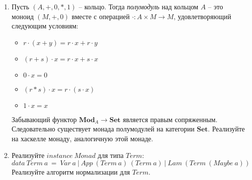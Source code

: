\documentclass[draft]{article}
\newcommand{\cat}[1]{\mathbf{#1}}
\newcommand{\Set}{\cat{Set}}
\begin{document}
\begin{enumerate}
\item Пусть $(A,+,0,*,1)$ -- кольцо.
Тогда \emph{полумодуль} над кольцом $A$ -- это моноид $(M,+,0)$ вместе с операцией $\cdot : A \times M \to M$, удовлетворяющий следующим условиям:
\begin{itemize}
\item $r \cdot (x + y) = r \cdot x + r \cdot y$
\item $(r + s) \cdot x = r \cdot x + s \cdot x$
\item $0 \cdot x = 0$
\item $(r * s) \cdot x = r \cdot (s \cdot x)$
\item $1 \cdot x = x$
\end{itemize}
Забывающий функтор $\cat{Mod}_A \to \Set$ является правым сопряженным.
Следовательно существует монада полумодулей на категории $\Set$.
Реализуйте на хаскелле монаду, аналогичную этой монаде.

\item Реализуйте $\mathit{instance}\ \mathit{Monad}$ для типа $\mathit{Term}$:
\[ \mathit{data}\ \mathit{Term}\ a\ =\ \mathit{Var}\ a\ |\ \mathit{App}\ (\mathit{Term}\ a)\ (\mathit{Term}\ a)\ |\ \mathit{Lam}\ (\mathit{Term}\ (\mathit{Maybe}\ a)) \]
Реализуйте алгоритм нормализации для $\mathit{Term}$.

\end{enumerate}
\end{document}
